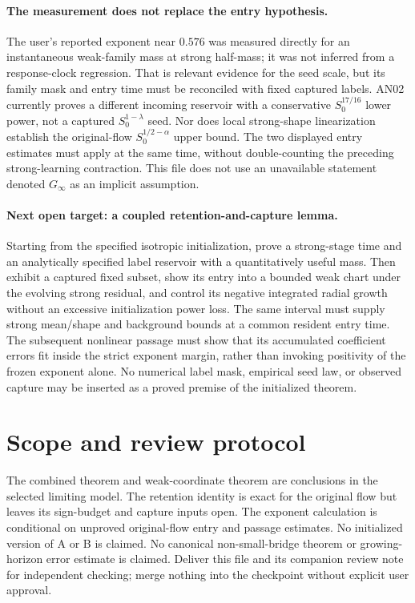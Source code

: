 \documentclass[11pt]{article}
\numberwithin{equation}{section}
\theoremstyle{remark}\newtheorem{remark}[theorem]{Remark}
\begin{document}
\paragraph{The measurement does not replace the entry hypothesis.}
The user's reported exponent near $0.576$ was measured directly for an
instantaneous weak-family mass at strong half-mass; it was not inferred
from a response-clock regression. That is relevant evidence for the seed
scale, but its family mask and entry time must be reconciled with fixed
captured labels. AN02 currently proves a different incoming reservoir
with a conservative $S_0^{17/16}$ lower power, not a captured
$S_0^{1-\lambda}$ seed. Nor does local strong-shape linearization establish
the original-flow $S_0^{1/2-\alpha}$ upper bound. The two displayed entry
estimates must apply at the same time, without double-counting the
preceding strong-learning contraction. This file does not use an
unavailable statement denoted $G_\infty$ as an implicit assumption.

\paragraph{Next open target: a coupled retention-and-capture lemma.}
Starting from the specified isotropic initialization, prove a strong-stage
time and an analytically specified label reservoir with a quantitatively
useful mass. Then exhibit a captured fixed subset, show its entry into a
bounded weak chart under the evolving strong residual, and control its
negative integrated radial growth without an excessive initialization
power loss. The same interval must supply strong mean/shape and background
bounds at a common resident entry time. The subsequent nonlinear passage
must show that its accumulated coefficient errors fit inside the strict
exponent margin, rather than invoking positivity of the frozen exponent
alone. No numerical label mask, empirical seed law, or observed capture
may be inserted as a proved premise of the initialized theorem.

\section*{Scope and review protocol}
The combined theorem and weak-coordinate theorem are conclusions in the
selected limiting model. The retention identity is exact for the original
flow but leaves its sign-budget and capture inputs open. The exponent
calculation is conditional on unproved original-flow entry and passage
estimates. No initialized version of A or B is claimed. No canonical
non-small-bridge theorem or growing-horizon error estimate is claimed.
Deliver this file and its companion review note for independent checking;
merge nothing into the checkpoint without explicit user approval.
\end{document}
